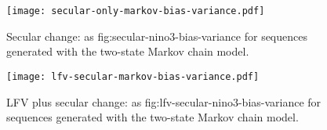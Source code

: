 \documentclass[
      draft,
      ef,
]{agutexSI2019}
\begin{document}
    \begin{figure}
      \centering
      \texttt{[image: secular-only-markov-bias-variance.pdf]}
      \caption{
        Secular change: as {fig:secular-nino3-bias-variance} for sequences generated with the two-state Markov chain model.
      }\label{fig:secular-only-markov-bias-variance}
    \end{figure}
    
    \begin{figure}
      \centering
      \texttt{[image: lfv-secular-markov-bias-variance.pdf]}
      \caption{
        LFV plus secular change: as {fig:lfv-secular-nino3-bias-variance} for sequences generated with the two-state Markov chain model.
      }\label{fig:lfv-secular-markov-bias-variance}
    \end{figure}
\end{document}

